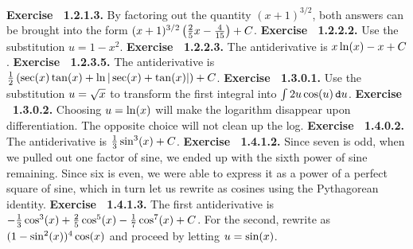  {\noindent \protect \bf  Exercise ~1.2.1.3.} By factoring out the quantity $(x+1)^{3/2}$, both answers can be brought into the form $(x+1)^{3/2}\left (\protect \frac  {2}{5}x-\protect \frac  {4}{15}\right )+C$. \protect \newline  \protect \newline  
 {\noindent \protect \bf  Exercise ~1.2.2.2.} Use the substitution $u=1-x^2$. \protect \newline  \protect \newline  
 {\noindent \protect \bf  Exercise ~1.2.2.3.} The antiderivative is $x\protect \qopname  \relax o{ln}(x)-x+C$. \protect \newline  \protect \newline  
 {\noindent \protect \bf  Exercise ~1.2.3.5.} The antiderivative is $\protect \frac  {1}{2}\left (\protect \qopname  \relax o{sec}(x)\protect \qopname  \relax o{tan}(x)+\protect \qopname  \relax o{ln}|\protect \qopname  \relax o{sec}(x)+\protect \qopname  \relax o{tan}(x)|\right )+C$. \protect \newline  \protect \newline  
 {\noindent \protect \bf  Exercise ~1.3.0.1.} Use the substitution $u=\protect \sqrt  {x}$ to transform the first integral into $\intop 2u\protect \qopname  \relax o{cos}(u) \mathop {}\protect \tmspace  -\thinmuskip {.1667em}\protect \mathtt  {d}u$. \protect \newline  \protect \newline  
 {\noindent \protect \bf  Exercise ~1.3.0.2.} Choosing $u=\protect \qopname  \relax o{ln}(x)$ will make the logarithm disappear upon differentiation. The opposite choice will not clean up the log. \protect \newline  \protect \newline  
 {\noindent \protect \bf  Exercise ~1.4.0.2.} The antiderivative is $\protect \frac  {1}{3}\protect \qopname  \relax o{sin}^3(x)+C$. \protect \newline  \protect \newline  
 {\noindent \protect \bf  Exercise ~1.4.1.2.} Since seven is odd, when we pulled out one factor of sine, we ended up with the sixth power of sine remaining. Since six is even, we were able to express it as a power of a perfect square of sine, which in turn let us rewrite as cosines using the Pythagorean identity. \protect \newline  \protect \newline  
 {\noindent \protect \bf  Exercise ~1.4.1.3.} The first antiderivative is $-\protect \frac  {1}{3}\protect \qopname  \relax o{cos}^3(x)+\protect \frac  {2}{5}\protect \qopname  \relax o{cos}^5(x)-\protect \frac  {1}{7}\protect \qopname  \relax o{cos}^7(x)+C$. For the second, rewrite as $(1-\protect \qopname  \relax o{sin}^2(x))^4\protect \qopname  \relax o{cos}(x)$ and proceed by letting $u=\protect \qopname  \relax o{sin}(x)$. \protect \newline  \protect \newline  
